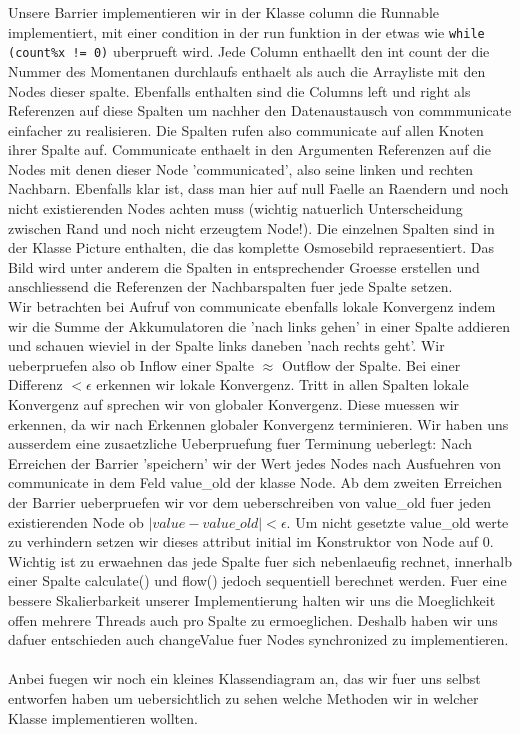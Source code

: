 \documentclass[12pt]{article}
\begin{document}
Unsere Barrier implementieren wir in der Klasse column die Runnable implementiert, mit einer condition in der run funktion in der etwas wie \verb+while (count%x != 0)+ uberprueft wird. Jede Column enthaellt den int count der die Nummer des Momentanen durchlaufs enthaelt als auch die Arrayliste mit den Nodes dieser spalte. Ebenfalls enthalten sind die Columns left und right als Referenzen auf diese Spalten um nachher den Datenaustausch von commmunicate einfacher zu realisieren. Die Spalten rufen also communicate auf allen Knoten ihrer Spalte auf. Communicate enthaelt in den Argumenten Referenzen auf die Nodes mit denen dieser Node 'communicated', also seine linken und rechten Nachbarn. Ebenfalls klar ist, dass man hier auf null Faelle an Raendern und noch nicht existierenden Nodes achten muss (wichtig natuerlich Unterscheidung zwischen Rand und noch nicht erzeugtem Node!). Die einzelnen Spalten sind in der Klasse Picture enthalten, die das komplette Osmosebild repraesentiert. Das Bild wird unter anderem die Spalten in entsprechender Groesse erstellen und anschliessend die Referenzen der Nachbarspalten fuer jede Spalte setzen.\\
Wir betrachten bei Aufruf von communicate ebenfalls lokale Konvergenz indem wir die Summe der Akkumulatoren die 'nach links gehen' in einer Spalte addieren und schauen wieviel in der Spalte links daneben 'nach rechts geht'. Wir ueberpruefen also ob Inflow einer Spalte $\approx$ Outflow der Spalte. Bei einer Differenz $< \epsilon$ erkennen wir lokale Konvergenz. Tritt in allen Spalten lokale Konvergenz auf sprechen wir von globaler Konvergenz. Diese muessen wir erkennen, da wir nach Erkennen globaler Konvergenz terminieren. Wir haben uns ausserdem eine zusaetzliche Ueberpruefung fuer Terminung ueberlegt: Nach Erreichen der Barrier 'speichern' wir der Wert jedes Nodes nach Ausfuehren von communicate in dem Feld value\_old der klasse Node. Ab dem zweiten Erreichen der Barrier ueberpruefen wir vor dem ueberschreiben von value\_old fuer jeden existierenden Node ob $|value-value\_old| < \epsilon$. Um nicht gesetzte value\_old werte zu verhindern setzen wir dieses attribut initial im Konstruktor von Node auf 0.\\
Wichtig ist zu erwaehnen das jede Spalte fuer sich nebenlaeufig rechnet, innerhalb einer Spalte calculate() und flow() jedoch sequentiell berechnet werden. Fuer eine bessere Skalierbarkeit unserer Implementierung halten wir uns die Moeglichkeit offen mehrere Threads auch pro Spalte zu ermoeglichen. Deshalb haben wir uns dafuer entschieden auch changeValue fuer Nodes synchronized zu implementieren.\\\\


Anbei fuegen wir noch ein kleines Klassendiagram an, das wir fuer uns selbst entworfen haben um uebersichtlich zu sehen welche Methoden wir in welcher Klasse implementieren wollten.





\end{document}
